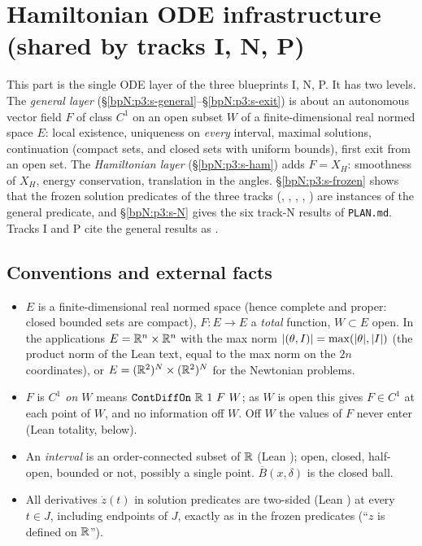 \section{Hamiltonian ODE infrastructure (shared by tracks I, N, P)}\label{bpN:p3}

This part is the single ODE layer of the three blueprints I, N, P. It has two levels. The \emph{general layer}
(\S\ref{bpN:p3:s-general}--\S\ref{bpN:p3:s-exit}) is about an autonomous vector field $F$ of class $C^1$ on an open
subset $W$ of a finite-dimensional real normed space $E$: local existence, uniqueness on \emph{every} interval,
maximal solutions, continuation (compact sets, and closed sets with uniform bounds), first exit from an open set.
The \emph{Hamiltonian layer} (\S\ref{bpN:p3:s-ham}) adds $F=X_H$: smoothness of $X_H$, energy conservation,
translation in the angles. \S\ref{bpN:p3:s-frozen} shows that the frozen solution predicates of the three tracks
(, , , ,
) are instances of the general predicate, and \S\ref{bpN:p3:s-N} gives the six track-N
results of \texttt{PLAN.md}. Tracks I and P cite the general results as .

\subsection{Conventions and external facts}\label{bpN:p3:s-conv}

\begin{itemize}
\item $E$ is a finite-dimensional real normed space (hence complete and proper: closed bounded sets are compact),
  $F:E\to E$ a \emph{total} function, $W\subset E$ open. In the applications $E=\mathbb{R}^n\times\mathbb{R}^n$ with the max norm
  $\lvert (\theta,I)\rvert=\max(\lvert \theta\rvert,\lvert I\rvert)$ (the product norm of the Lean text, equal to the max norm on the $2n$
  coordinates), or $E=(\mathbb{R}^2)^N\times(\mathbb{R}^2)^N$ for the Newtonian problems.
\item $F$ is \emph{$C^1$ on $W$} means $\texttt{ContDiffOn}\ \R\ 1\ F\ W$; as $W$ is open this gives $F\in C^1$ at each
  point of $W$, and no information off $W$. Off $W$ the values of $F$ never enter (Lean totality, below).
\item An \emph{interval} is an order-connected subset of $\mathbb{R}$ (Lean ); open, closed, half-open,
  bounded or not, possibly a single point. $\overline B(x,\delta)$ is the closed ball.
\item All derivatives $\dot z(t)$ in solution predicates are two-sided (Lean ) at every $t\in J$,
  including endpoints of $J$, exactly as in the frozen predicates (``$z$ is defined on $\mathbb{R}$'').
\end{itemize}

